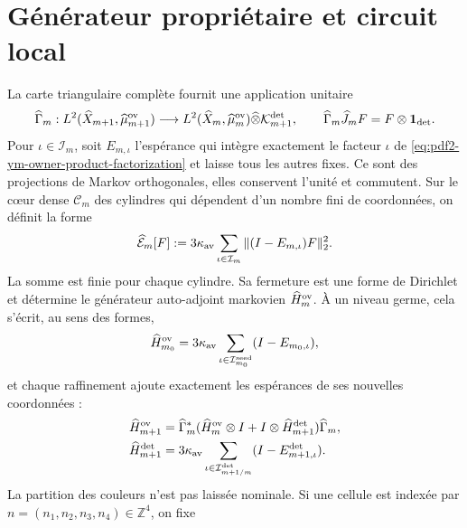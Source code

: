 \section{Générateur propriétaire et circuit local}

La carte triangulaire complète fournit une application unitaire
\begin{equation}\label{eq:pdf2-ym-owner-triangular-unitary}
 \widehat\Gamma_m:
 L^2(\widehat X_{m+1},\widehat\mu_{m+1}^{\rm ov})
 \longrightarrow
 L^2(\widehat X_m,\widehat\mu_m^{\rm ov})
 \widehat\otimes\mathcal K_{m+1}^{\rm det},
 \qquad
 \widehat\Gamma_m\widehat J_mF=F\otimes\mathbf1_{\rm det}.
\end{equation}
Pour $\iota\in\mathcal I_m$, soit $E_{m,\iota}$ l'espérance qui intègre exactement le facteur $\iota$ de \eqref{eq:pdf2-ym-owner-product-factorization} et laisse tous les autres fixes. Ce sont des projections de Markov orthogonales, elles conservent l'unité et commutent. Sur le cœur dense $\mathscr C_m$ des cylindres qui dépendent d'un nombre fini de coordonnées, on définit la forme
\begin{equation}\label{eq:pdf2-ym-owner-full-form}
 \widehat{\mathcal E}_m[F]
 :=3\kappa_{\rm av}\sum_{\iota\in\mathcal I_m}
   \|(I-E_{m,\iota})F\|_2^2.
\end{equation}
La somme est finie pour chaque cylindre. Sa fermeture est une forme de Dirichlet et
détermine le générateur auto-adjoint markovien
$\widehat H_m^{\rm ov}$. À un niveau germe, cela s’écrit, au sens des
formes,
\begin{equation}\label{eq:pdf2-ym-owner-base-generator}
 \widehat H_{m_0}^{\rm ov}
 =3\kappa_{\rm av}
  \sum_{\iota\in\mathcal I_{m_0}^{\rm seed}}(I-E_{m_0,\iota}),
\end{equation}
et chaque raffinement ajoute exactement les espérances de ses nouvelles coordonnées :
\begin{equation}\label{eq:pdf2-ym-owner-refined-generator}
 \begin{aligned}
 \widehat H_{m+1}^{\rm ov}
 &=\widehat\Gamma_m^*
   (\widehat H_m^{\rm ov}\otimes I
    +I\otimes\widehat H_{m+1}^{\rm det})\widehat\Gamma_m,\\
 \widehat H_{m+1}^{\rm det}
 &=3\kappa_{\rm av}
   \sum_{\iota\in\mathcal I_{m+1/m}^{\rm det}}
   (I-E_{m+1,\iota}^{\rm det}).
 \end{aligned}
\end{equation}
La partition des couleurs n’est pas laissée nominale. Si une cellule est indexée par
$n=(n_1,n_2,n_3,n_4)\in\mathbb Z^4$, on fixe

